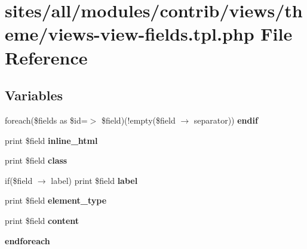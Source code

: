 \hypertarget{views-view-fields_8tpl_8php}{
\section{sites/all/modules/contrib/views/theme/views-view-fields.tpl.php File Reference}
\label{views-view-fields_8tpl_8php}
}
\subsection*{Variables}
\begin{CompactItemize}
\item 
\hypertarget{views-view-fields_8tpl_8php_82cd33ca97ff99f2fcc5e9c81d65251b}{
foreach(\$fields as \$id=$>$ \$field)(!empty(\$field $\rightarrow$ separator)) \textbf{endif}}
\label{views-view-fields_8tpl_8php_82cd33ca97ff99f2fcc5e9c81d65251b}

\item 
\hypertarget{views-view-fields_8tpl_8php_298e750db56fc4c260852aff71219713}{
print \$field \textbf{inline\_\-html}}
\label{views-view-fields_8tpl_8php_298e750db56fc4c260852aff71219713}

\item 
\hypertarget{views-view-fields_8tpl_8php_2ea91f7c5f35299ea09f8e00a18a26b0}{
print \$field \textbf{class}}
\label{views-view-fields_8tpl_8php_2ea91f7c5f35299ea09f8e00a18a26b0}

\item 
\hypertarget{views-view-fields_8tpl_8php_9382b3bdafeb897561b91922c967c16e}{
if(\$field $\rightarrow$ label) print \$field \textbf{label}}
\label{views-view-fields_8tpl_8php_9382b3bdafeb897561b91922c967c16e}

\item 
\hypertarget{views-view-fields_8tpl_8php_80508bd2b439e4cd38ce36c9e345b33b}{
print \$field \textbf{element\_\-type}}
\label{views-view-fields_8tpl_8php_80508bd2b439e4cd38ce36c9e345b33b}

\item 
\hypertarget{views-view-fields_8tpl_8php_b9c021825db1d9cdc4bf17f40b3bd76c}{
print \$field \textbf{content}}
\label{views-view-fields_8tpl_8php_b9c021825db1d9cdc4bf17f40b3bd76c}

\item 
\hypertarget{views-view-fields_8tpl_8php_672d9707ef91db026c210f98cc601123}{
\textbf{endforeach}}
\label{views-view-fields_8tpl_8php_672d9707ef91db026c210f98cc601123}

\end{CompactItemize}


